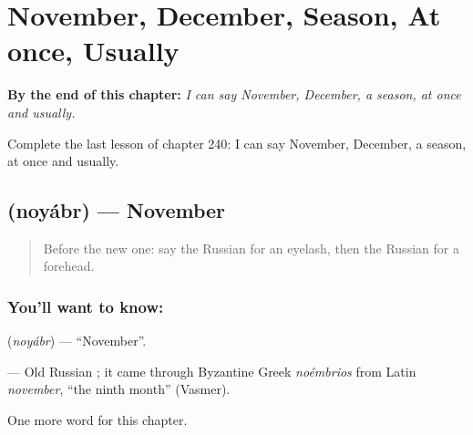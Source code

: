 
\chapter{November, December, Season, At once, Usually}
\label{ch:ru-november-december-season-at-once-usually}

\begin{chapteropening}
\textbf{By the end of this chapter:} \emph{I can say November, December, a season, at once and usually.}

Complete the last lesson of chapter 240: I can say November, December, a season, at once and usually.
\end{chapteropening}

\section[\texorpdfstring{\ru{ноябрь} (noyábr)}{ноябрь (noyábr)}]{ (noyábr) — November}

\label{lesson:RU-C240-noyabr}



\begin{quote}
Before the new one: say the Russian for an eyelash, then the Russian for a forehead.
\end{quote}

\subsection*{You'll want to know: }
\textbf{} (\emph{noyábr}) — \textquotedblleft{}November\textquotedblright{}.

\begin{cousinweb}
\textbf{} — Old Russian \emph{}; it came through Byzantine Greek \emph{noémbrios} from Latin \emph{november}, \textquotedblleft{}the ninth month\textquotedblright{} (Vasmer).
\end{cousinweb}

\begin{grammarlens}[title={What you've built}]
One more word for this chapter.
\end{grammarlens}

